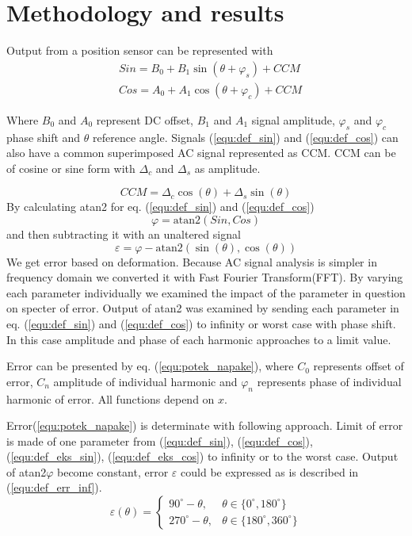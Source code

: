 \documentclass[a4paper]{article}
\begin{document}
\section{Methodology and results}
Output from a position sensor can be represented with
\begin{eqnarray}
\label{equ:def_sin}
&Sin = B_{0} + B_1 \sin(\theta + \varphi_{s}) + CCM\\
\label{equ:def_cos}
&Cos = A_{0} + A_1 \cos(\theta + \varphi_{c}) + CCM
\end{eqnarray}

Where $B_0$ and $A_0$ represent DC offset, $B_1$ and $A_1$ signal amplitude, $\varphi_s$ and $\varphi_c$  phase shift and $\theta$ reference angle. Signals (\ref{equ:def_sin}) and (\ref{equ:def_cos}) can also have a common superimposed AC signal  represented as CCM. CCM can be of cosine or sine form with $\Delta_c$ and $\Delta_s$ as amplitude.

\begin{equation}
\label{equ:CCM}
CCM = \Delta_c \cos(\theta)+\Delta_s \sin(\theta)
\end{equation}
By calculating atan2 for eq. (\ref{equ:def_sin}) and (\ref{equ:def_cos})
\begin{equation}
\label{equ:def_kot}
\varphi = \mathrm{atan2}(Sin,Cos)
\end{equation}
and then subtracting it with an unaltered signal
\begin{equation}
\label{equ:def_err}
\varepsilon =\varphi - \mathrm{atan2}(\sin(\theta),\cos(\theta))
\end{equation}
We get error based on deformation. Because  AC signal analysis is simpler in frequency domain we converted it with Fast Fourier Transform(FFT). By varying each parameter individually we examined the impact of the parameter in question on specter of error. Output of atan2 was examined by sending each parameter in eq. (\ref{equ:def_sin}) and (\ref{equ:def_cos}) to infinity or worst case with phase shift.
In this case amplitude and phase of each harmonic approaches to a limit value.


\newpage

Error can be presented by eq. (\ref{equ:potek_napake}), where $C_0$ represents offset of error, $C_n$ amplitude of individual harmonic and $\varphi_n$ represents phase of individual harmonic of error. All functions depend on $x$.



Error(\ref{equ:potek_napake}) is determinate with following approach. Limit of error is made of one parameter from (\ref{equ:def_sin}), (\ref{equ:def_cos}), (\ref{equ:def_eks_sin}), (\ref{equ:def_eks_cos}) to infinity or to the worst case. Output of atan2$\varphi$ become constant, error $\varepsilon$  could be expressed as is described in (\ref{equ:def_err_inf}).
\begin{equation}
\label{equ:def_err_inf}
\varepsilon(\theta)=
\begin{cases}
90^\circ-\theta, & \theta \in \{0^\circ,180^\circ\}\\
270^\circ-\theta, & \theta \in \{180^\circ,360^\circ\}
\end{cases}
\end{equation}
\end{document}
